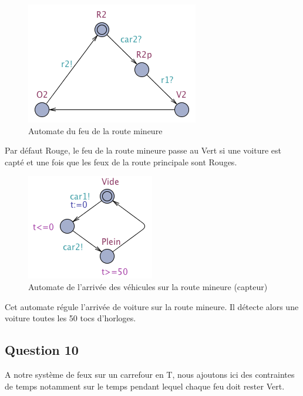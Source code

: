 \documentclass[11pt]{article}
\begin{document}
\begin{figure}[H]
	\centering
	\includegraphics{ressources/part3/Q9-2.png}
	\caption{Automate du feu de la route mineure}
\end{figure}

Par défaut Rouge, le feu de la route mineure passe au Vert si une voiture est capté et une fois que les feux de la route principale sont Rouges.

\begin{figure}[H]
	\centering
	\includegraphics{ressources/part3/Q9-3.png}
	\caption{Automate de l'arrivée des véhicules sur la route mineure (capteur)}
\end{figure}

Cet automate régule l'arrivée de voiture sur la route mineure. Il détecte alors une voiture toutes les 50 tocs d'horloges.

\subsection{Question 10}

A notre système de feux sur un carrefour en T, nous ajoutons ici des contraintes de temps notamment sur le temps pendant lequel chaque feu doit rester Vert.


\end{document}
